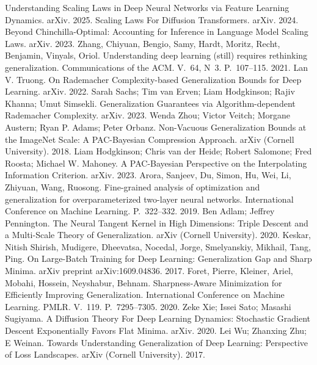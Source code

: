  Understanding Scaling Laws in Deep Neural Networks via Feature Learning Dynamics. arXiv. 2025.
 Scaling Laws For Diffusion Transformers. arXiv. 2024.
 Beyond Chinchilla-Optimal: Accounting for Inference in Language Model Scaling Laws. arXiv. 2023.
 Zhang, Chiyuan, Bengio, Samy, Hardt, Moritz, Recht, Benjamin, Vinyals, Oriol. Understanding deep learning (still) requires rethinking generalization. Communications of the ACM. V.~64, N~3. P.~107--115. 2021.
 Lan V. Truong. On Rademacher Complexity-based Generalization Bounds for Deep Learning. arXiv. 2022.
 Sarah Sachs; Tim van Erven; Liam Hodgkinson; Rajiv Khanna; Umut Simsekli. Generalization Guarantees via Algorithm-dependent Rademacher Complexity. arXiv. 2023.
 Wenda Zhou; Victor Veitch; Morgane Austern; Ryan P. Adams; Peter Orbanz. Non-Vacuous Generalization Bounds at the ImageNet Scale: A PAC-Bayesian Compression Approach. arXiv (Cornell University). 2018.
 Liam Hodgkinson; Chris van der Heide; Robert Salomone; Fred Roosta; Michael W. Mahoney. A PAC-Bayesian Perspective on the Interpolating Information Criterion. arXiv. 2023.
 Arora, Sanjeev, Du, Simon, Hu, Wei, Li, Zhiyuan, Wang, Ruosong. Fine-grained analysis of optimization and generalization for overparameterized two-layer neural networks. International Conference on Machine Learning. P.~322--332. 2019.
 Ben Adlam; Jeffrey Pennington. The Neural Tangent Kernel in High Dimensions: Triple Descent and a Multi-Scale Theory of Generalization. arXiv (Cornell University). 2020.
 Keskar, Nitish Shirish, Mudigere, Dheevatsa, Nocedal, Jorge, Smelyanskiy, Mikhail, Tang, Ping. On Large-Batch Training for Deep Learning: Generalization Gap and Sharp Minima. arXiv preprint arXiv:1609.04836. 2017.
 Foret, Pierre, Kleiner, Ariel, Mobahi, Hossein, Neyshabur, Behnam. Sharpness-Aware Minimization for Efficiently Improving Generalization. International Conference on Machine Learning. PMLR. V.~119. P.~7295--7305. 2020.
 Zeke Xie; Issei Sato; Masashi Sugiyama. A Diffusion Theory For Deep Learning Dynamics: Stochastic Gradient Descent Exponentially Favors Flat Minima. arXiv. 2020.
 Lei Wu; Zhanxing Zhu; E Weinan. Towards Understanding Generalization of Deep Learning: Perspective of Loss Landscapes. arXiv (Cornell University). 2017.
